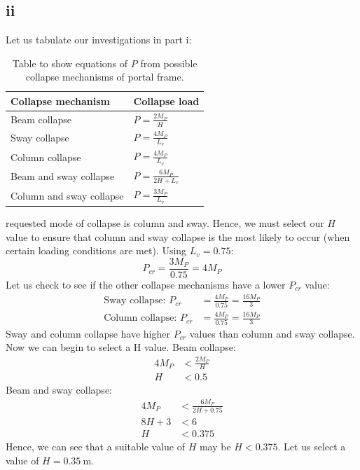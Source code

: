 \documentclass[11pt]{article}
\numberwithin{equation}{section}
\begin{document}
\subsection{ii}
Let us tabulate our investigations in part i:
\begin{table}[H]
    \centering
    \begin{tabular}{ll}
        \toprule
        Collapse mechanism & Collapse load\\
        \midrule
        Beam collapse & $P = \frac{2M_P}{H}$\\
        Sway collapse & $P = \frac{4M_P}{L_v}$\\
        Column collapse & $P = \frac{4M_P}{L_v}$\\
        Beam and sway collapse & $P = \frac{6M_P}{2H + L_v}$\\
        Column and sway collapse & $P = \frac{3M_P}{L_v}$\\
        \bottomrule
    \end{tabular}
    \caption{Table to show equations of $P$ from possible collapse mechanisms of portal frame.}
    \label{tab:collapses}
\end{table} requested mode of collapse is column and sway. Hence, we must select our $H$ value to ensure that column and sway collapse is the most likely to occur (when certain loading conditions are met). Using $L_v = 0.75$:
\begin{equation}
    P_{cr} = \frac{3M_P}{0.75} = 4 M_P
\end{equation}
Let us check to see if the other collapse mechanisms have a lower $P_{cr}$ value:
\begin{align}
    \textrm{Sway collapse: } P_{cr} &= \frac{4M_P}{0.75} = \frac{16M_P}{3}\\
    \textrm{Column collapse: } P_{cr} &= \frac{4M_P}{0.75} = \frac{16M_P}{3} 
\end{align}
Sway and column collapse have higher $P_{cr}$ values than column and sway collapse. Now we can begin to select a H value. Beam collapse:
\begin{align}
    4M_P &< \frac{2M_P}{H}\\
    H &< 0.5
\end{align}
Beam and sway collapse:
\begin{align}
    4M_P &< \frac{6M_P}{2H + 0.75}\\
    8H + 3 &< 6\\
    H &< 0.375
\end{align}
Hence, we can see that a suitable value of $H$ may be $H < 0.375$. Let us select a value of $H = \SI{0.35}{\meter}$.
\end{document}
